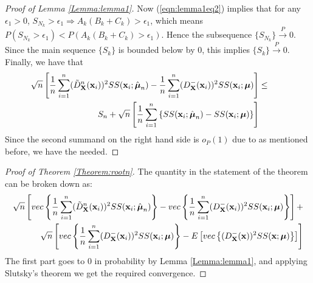 \begin{proof}[Proof of Lemma \ref{Lemma:lemma1}]
Now (\ref{eqn:lemma1eq2}) implies that for any $\epsilon_1 > 0$, $S_{N_k} > \epsilon_1 \Rightarrow A_k (B_k + C_k) > \epsilon_1$, which means $ P(S_{N_k} > \epsilon_1) < P(A_k (B_k + C_k) > \epsilon_1)$. Hence the subsequence $\{S_{N_k}\} \stackrel{P}{\rightarrow} 0$. Since the main sequence $\{S_k\}$ is bounded below by 0, this implies $\{S_k\} \stackrel{P}{\rightarrow} 0$. Finally, we have that
%
\begin{eqnarray}
\sqrt n \left[
\frac{1}{n} \sum_{i=1}^n (\tilde D^n_{\mathbf{X}} ({\bf{x}}_i))^2 SS({\bf{x}}_i; \hat{{\boldsymbol{\mu}}}_n) -
\frac{1}{n} \sum_{i=1}^n (D^-_{\mathbf{X}} ({\bf{x}}_i))^2 SS({\bf{x}}_i; {\boldsymbol{\mu}}) \right] &\leq & \hspace{1em} \notag\\
S_n +  \sqrt{n} \left[ \frac{1}{n} \sum_{i=1}^{n} \left\{ SS({\bf{x}}_i; \hat{{\boldsymbol{\mu}}}_{n}) - SS({\bf{x}}_i; {\boldsymbol{\mu}}) \right\} \right] &&
\end{eqnarray}
%
Since the second summand on the right hand side is $o_P(1)$ due to \cite{durre14} as mentioned before, we have the needed.
\end{proof}

\begin{proof}[Proof of Theorem \ref{Theorem:rootn}]
The quantity in the statement of the theorem can be broken down as:
%
\begin{eqnarray*}
\sqrt n \left[ vec\left\{ \frac{1}{n} \sum_{i=1}^n (\tilde D^n_{\mathbf{X}} ({\bf{x}}_i))^2 SS({\bf{x}}_i; \hat{{\boldsymbol{\mu}}}_n) \right\} - vec\left\{ \frac{1}{n} \sum_{i=1}^n (D^-_{\mathbf{X}} ({\bf{x}}_i))^2 SS({\bf{x}}_i; {\boldsymbol{\mu}}) \right\} \right] +\\
\sqrt n \left[ vec\left\{ \frac{1}{n} \sum_{i=1}^n (D^-_{\mathbf{X}} ({\bf{x}}_i))^2 SS({\bf{x}}_i; {\boldsymbol{\mu}}) \right\} - E \left[ vec\left\{ (D^-_{\mathbf{X}} ({\bf{x}}))^2 SS({\bf{x}}; {\boldsymbol{\mu}}) \right\} \right] \right]
\end{eqnarray*}
%
The first part goes to 0 in probability by Lemma \ref{Lemma:lemma1}, and applying Slutsky's theorem we get the required convergence.
\end{proof}

